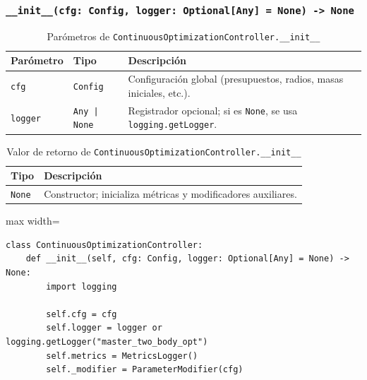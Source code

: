 \subsubsection*{\texttt{\_\_init\_\_(cfg:\ Config, logger:\ Optional[Any] = None) -> None}}

\begin{table}[H]
  \centering
  \caption{Parómetros de \texttt{ContinuousOptimizationController.\_\_init\_\_}}
  \small
  \begin{tabularx}{\textwidth}{@{}p{}p{}X@{}}
    \toprule
    \textbf{Parómetro} & \textbf{Tipo} & \textbf{Descripción} \\
    \midrule
    \texttt{cfg} & \texttt{Config} & Configuración global (presupuestos, radios, masas iniciales, etc.). \\
    \texttt{logger} & \texttt{Any | None} & Registrador opcional; si es \texttt{None}, se usa \texttt{logging.getLogger}. \\
    \bottomrule
  \end{tabularx}
\end{table}

\begin{table}[H]
  \centering
  \caption{Valor de retorno de \texttt{ContinuousOptimizationController.\_\_init\_\_}}
  \small
  \begin{tabularx}{\textwidth}{@{}p{}X@{}}
    \toprule
    \textbf{Tipo} & \textbf{Descripción} \\
    \midrule
    \texttt{None} & Constructor; inicializa métricas y modificadores auxiliares. \\
    \bottomrule
  \end{tabularx}
\end{table}

\begin{listing}[H]
\caption{Bloque de código de \texttt{ContinuousOptimizationController.\_\_init\_\_}}
\begin{adjustbox}{max width=\textwidth}
\begin{minipage}{\textwidth}
\begin{verbatim}
class ContinuousOptimizationController:
    def __init__(self, cfg: Config, logger: Optional[Any] = None) -> None:
        import logging

        self.cfg = cfg
        self.logger = logger or logging.getLogger("master_two_body_opt")
        self.metrics = MetricsLogger()
        self._modifier = ParameterModifier(cfg)
\end{verbatim}
\end{minipage}
\end{adjustbox}
\end{listing}

